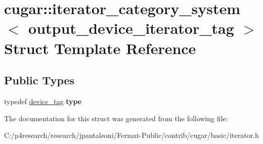 \hypertarget{structcugar_1_1iterator__category__system_3_01output__device__iterator__tag_01_4}{}\section{cugar\+:\+:iterator\+\_\+category\+\_\+system$<$ output\+\_\+device\+\_\+iterator\+\_\+tag $>$ Struct Template Reference}
\label{structcugar_1_1iterator__category__system_3_01output__device__iterator__tag_01_4}
\subsection*{Public Types}
\begin{DoxyCompactItemize}
\item 
\mbox{\label{structcugar_1_1iterator__category__system_3_01output__device__iterator__tag_01_4_a8e1c1b6cd78904bb8e6902048b1a13cf}} 
typedef \hyperlink{structcugar_1_1device__tag}{device\+\_\+tag} {\bfseries type}
\end{DoxyCompactItemize}


The documentation for this struct was generated from the following file\+:\begin{DoxyCompactItemize}
\item 
C\+:/p4research/research/jpantaleoni/\+Fermat-\/\+Public/contrib/cugar/basic/iterator.\+h\end{DoxyCompactItemize}
